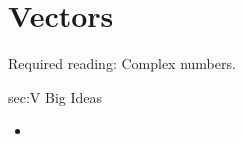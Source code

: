 \chapter{Vectors}
\label{chap:V}

Required reading: Complex numbers.
\begin{bigideas}{sec:V Big Ideas}
\begin{itemize}
  \item 
\end{itemize}
\end{bigideas}